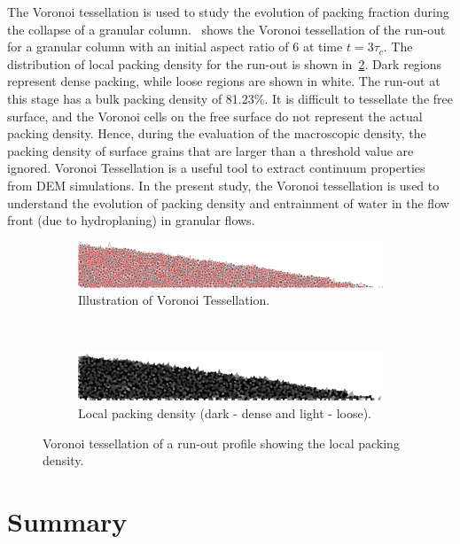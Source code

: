 The Voronoi tessellation is used to study the evolution of packing fraction 
during the collapse of a granular column.~ shows the 
Voronoi tessellation of the run-out for a granular column with an initial 
aspect ratio of 6 at time $t = 3 \tau_c$. The distribution of local packing 
density for the run-out is shown in~\cref{fig:local_density}. Dark regions 
represent dense packing, while loose regions are shown in white. The run-out at 
this stage has a bulk packing density of 81.23\%. It is difficult to tessellate 
the free surface, and the Voronoi cells on the free surface do not represent 
the actual packing density. Hence, during the evaluation of the macroscopic 
density, the packing density of surface grains that are larger than a threshold 
value are ignored. Voronoi Tessellation is a useful tool to extract continuum 
properties from DEM simulations. In the present study, the Voronoi tessellation 
is used to understand the evolution of packing density and entrainment of water 
in the flow front (due to hydroplaning) in granular flows.

\begin{figure}[tbhp]

\begin{subfigure}[b]{0.95\textwidth}
\includegraphics[width=\textwidth]{tessellation}
\caption{Illustration of Voronoi Tessellation.}
\label{fig:tessellation}
\end{subfigure}
\\
\begin{subfigure}[b]{0.87\textwidth}

\includegraphics[width=\textwidth]{local_density}
\caption{Local packing density (dark - dense and light - loose).}
\label{fig:local_density}
\end{subfigure}
\caption{Voronoi tessellation of a run-out profile showing the local packing 
density.}
\label{fig:voronoi_tesselation}
\end{figure}

\section{Summary}

